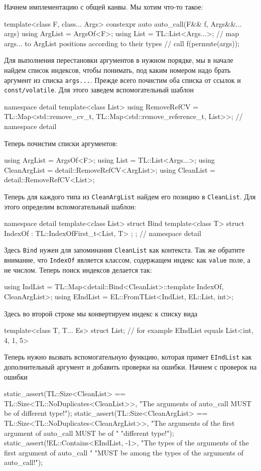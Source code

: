 Начнем имплементацию с общей канвы.
Мы хотим что-то такое:
\begin{cppcode}
template<class F, class... Args>
constexpr auto auto_call(F&& f, Args&&... args) {
  using ArgList = ArgsOf<F>;
  using List = TL::List<Args...>;
  // map args... to ArgList positions according to their types
  // call f(permute(args));
}
\end{cppcode}
Для выполнения перестановки аргументов в нужном порядке, мы в начале найдем список индексов, чтобы понимать, под каким номером надо брать аргумент из списка \verb"args...".
Прежде всего почистим оба списка от ссылок и \verb"const/volatile".
Для этого заведем вспомогательный шаблон
\begin{cppcode}[\nonumbers]
namespace detail {
template<class List>
using RemoveRefCV =
    TL::Map<std::remove_cv_t, TL::Map<std::remove_reference_t, List>>;
} // namespace detail
\end{cppcode}
Теперь почистим списки аргументов:
\begin{cppcode}[\nonumbers]
using ArgList = ArgsOf<F>;
using List = TL::List<Args...>;
using CleanArgList = detail::RemoveRefCV<ArgList>;
using CleanList = detail::RemoveRefCV<List>;
\end{cppcode}
Теперь для каждого типа из \verb"CleanArgList" найдем его позицию в \verb"CleanList".
Для этого определим вспомогательный шаблон:
\begin{cppcode}
namespace detail {
template<class List>
struct Bind {
  template<class T>
  struct IndexOf : TL::IndexOfFirst_t<List, T> {};
};
} // namespace detail
\end{cppcode}
Здесь \verb"Bind" нужен для запоминания \verb"CleanList" как контекста.
Так же обратите внимание, что \verb"IndexOf" является классом, содержащем индекс как \verb"value" поле, а не числом.
Теперь поиск индексов делается так:
\begin{cppcode}
using IndList = TL::Map<detail::Bind<CleanList>::template IndexOf, CleanArgList>;
using EIndList = EL::FromTList<IndList, EL::List, int>;
\end{cppcode}
Здесь во второй строке мы конвертируем индекс к списку вида
\begin{cppcode}
template<class T, T... Es>
struct List{};
// for example EIndList equals List<int, 4, 1, 5>
\end{cppcode}
Теперь нужно вызвать вспомогательную функцию, которая примет \verb"EIndList" как дополнительный аргумент и добавить проверки на ошибки.
Начнем с проверок на ошибки
\begin{cppcode}
static_assert(TL::Size<CleanList> == TL::Size<TL::NoDuplicates<CleanList>>,
              "The arguments of auto_call MUST be of different type!");
static_assert(TL::Size<CleanArgList> == TL::Size<TL::NoDuplicates<CleanArgList>>,
              "The arguments of the first argument of auto_call MUST be of "
              "different type!");
static_assert(!EL::Contains<EIndList, -1>,
              "The types of the arguments of the first argument of auto_call "
              "MUST be among the types of the arguments of auto_call!");
\end{cppcode}
